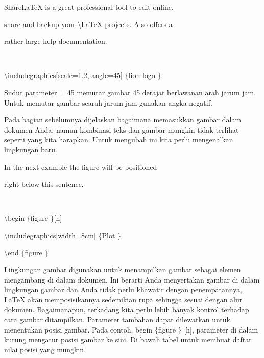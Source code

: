 ShareLaTeX is a great professional tool to edit online, \par
\noindent
  \par
\noindent
share and backup your  $  \setminus $LaTeX projects. Also offers a  \par
\vspace{12pt}
\noindent
rather large help documentation. \par
\noindent
 $  $ \par
\noindent
 $  \setminus $includegraphics[scale=1.2, angle=45] $  \{  $lion-logo $  \}  $ \par
\vspace{12pt}
\vspace{12pt}
\noindent
Sudut parameter = 45 memutar gambar 45 derajat berlawanan arah jarum jam. Untuk memutar gambar searah jarum jam gunakan angka negatif. \par
\vspace{16pt}
\noindent
 \hspace*{0.5in} Pada bagian sebelumnya dijelaskan bagaimana memasukkan gambar dalam dokumen Anda, namun kombinasi teks dan gambar mungkin tidak terlihat seperti yang kita harapkan. Untuk mengubah ini kita perlu mengenalkan lingkungan baru. \par
\vspace{12pt}
\noindent
{\fontsize{14pt}{14pt}\selectfont In the next example the figure will be positioned  \\} \par
\vspace{14pt}
\noindent
{\fontsize{14pt}{14pt}\selectfont right below this sentence. \\} \par
\noindent
{\fontsize{14pt}{14pt}\selectfont  $  $ \\} \par
\noindent
{\fontsize{14pt}{14pt}\selectfont  $  \setminus $begin $  \{  $figure $  \}  $[h] \\} \par
\vspace{14pt}
\noindent
{\fontsize{14pt}{14pt}\selectfont  $  \setminus $includegraphics[width=8cm] $  \{  $Plot $  \}  $ \\} \par
\vspace{14pt}
\noindent
{\fontsize{14pt}{14pt}\selectfont  $  \setminus $end $  \{  $figure $  \}  $ \\} \par
\noindent
 \hspace*{0.5in} Lingkungan gambar digunakan untuk menampilkan gambar sebagai elemen mengambang di dalam dokumen. Ini berarti Anda menyertakan gambar di dalam lingkungan gambar dan Anda tidak perlu khawatir dengan penempatannya, LaTeX akan memposisikannya sedemikian rupa sehingga sesuai dengan alur dokumen. Bagaimanapun, terkadang kita perlu lebih banyak kontrol terhadap cara gambar ditampilkan. Parameter tambahan dapat dilewatkan untuk menentukan posisi gambar. Pada contoh, begin  $  \{  $figure $  \}  $ [h], parameter di dalam kurung mengatur posisi gambar ke sini. Di bawah tabel untuk membuat daftar nilai posisi yang mungkin. \par
